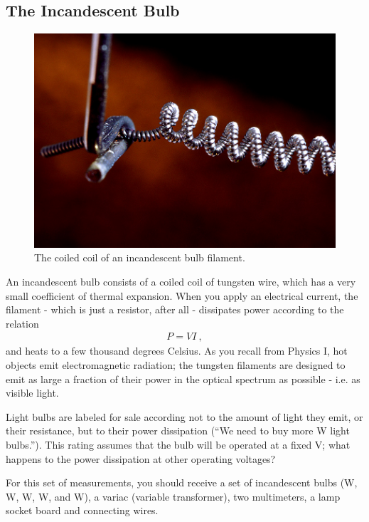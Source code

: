 \documentclass[12pt]{article}
\begin{document}
\subsection{The Incandescent Bulb}
\label{sec:incandescent}

\begin{figure}
  \centering
  \includegraphics[width=\textwidth/2]{figures/filament}
  \caption{The coiled coil of an incandescent bulb filament.}
  \label{fig:filament}
\end{figure}
An incandescent bulb consists of a coiled coil of tungsten wire, which
has a very small coefficient of thermal expansion.  When you apply an
electrical current, the filament - which is just a resistor, after all
- dissipates power according to the relation
\begin{gather}
  P = VI\ ,
\label{eq:power}
\end{gather}
and heats to a few thousand degrees Celsius.  As you recall from
Physics I, hot objects emit electromagnetic radiation; the tungsten
filaments are designed to emit as large a fraction of their power in
the optical spectrum as possible - i.e. as visible light.

Light bulbs are labeled for sale according not to the amount of light
they emit, or their resistance, but to their power dissipation (``We
need to buy more \unit[60]{W} light bulbs.'').  This rating assumes
that the bulb will be operated at a fixed \unit[120]{V}; what happens
to the power dissipation at other operating voltages?

For this set of measurements, you should receive a set of incandescent
bulbs (\unit[25]{W}, \unit[40]{W}, \unit[60]{W}, \unit[75]{W}, and
\unit[100]{W}), a variac (variable transformer), two multimeters, a
lamp socket board and connecting wires.
\end{document}
